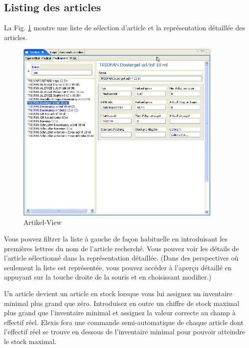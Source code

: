 \subsection{Listing des articles}
La Fig. \ref{fig:artikel} montre une liste de sélection d'article et la représentation détaillée des articles.

\begin{figure}[htp]
\begin{center}
  \includegraphics[width=0.9\textwidth]{images/artikelview}
  \caption{Artikel-View}
  \label{fig:artikel}
\end{center}
\end{figure}
Vous pouvez filtrer la liste à gauche de façon habituelle en introduisant les premières lettres du nom de l'article recherché. Vous pouvez voir les détails de l'article sélectionné dans la représentation détaillée. (Dans des perspectives où seulement la liste est représentée, vous pouvez accéder à l'aperçu détaillé en appuyant sur la touche droite de la souris et en choisissant  \glqq modifier\grqq{}.)

Un article devient un article en stock lorsque vous lui assignez un inventaire minimal plus grand que zéro. Introduisez en outre un chiffre de stock maximal plus grand que l'inventaire minimal et assignez la valeur correcte au champ \glqq à effectif réel\grqq{}. Elexis fera une commande semi-automatique de chaque article dont l'effectif réel se trouve en dessous de l'inventaire minimal pour pouvoir atteindre le stock maximal.

